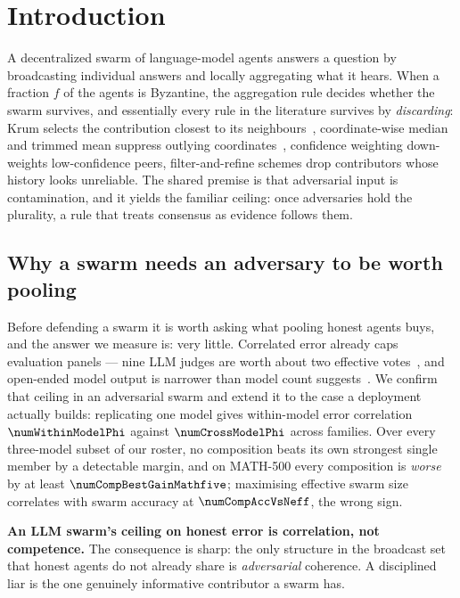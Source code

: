 \section{Introduction}
\label{sec:introduction}

A decentralized swarm of language-model agents answers a question by
broadcasting individual answers and locally aggregating what it hears. When a
fraction $f$ of the agents is Byzantine, the aggregation rule decides whether the
swarm survives, and essentially every rule in the literature survives by
\emph{discarding}: Krum selects the contribution closest to its
neighbours~\cite{blanchard2017krum}, coordinate-wise median and trimmed mean
suppress outlying coordinates~\cite{yin2018trimmed}, confidence weighting
down-weights low-confidence peers, filter-and-refine schemes drop contributors
whose history looks unreliable. The shared premise is that adversarial input is
contamination, and it yields the familiar ceiling: once adversaries hold the
plurality, a rule that treats consensus as evidence follows them.

\subsection{Why a swarm needs an adversary to be worth pooling}

Before defending a swarm it is worth asking what pooling honest agents buys, and
the answer we measure is: very little. Correlated error already caps evaluation
panels --- nine LLM judges are worth about two effective
votes~\cite{judgecorr,panelcorr}, and open-ended model output is narrower than
model count suggests~\cite{hivemind}. We confirm that ceiling in an adversarial
swarm and extend it to the case a deployment actually builds: replicating one
model gives within-model error correlation $\numWithinModelPhi$ against
$\numCrossModelPhi$ across families. Over every three-model subset of our roster,
no composition beats its own strongest single member by a detectable margin, and
on MATH-500 every composition is \emph{worse} by at least
$\numCompBestGainMathfive$; maximising effective swarm size correlates with swarm
accuracy at $\numCompAccVsNeff$, the wrong sign.

\textbf{An LLM swarm's ceiling on honest error is correlation, not competence.}
The consequence is sharp: the only structure in the broadcast set that honest
agents do not already share is \emph{adversarial} coherence. A disciplined liar
is the one genuinely informative contributor a swarm has.

